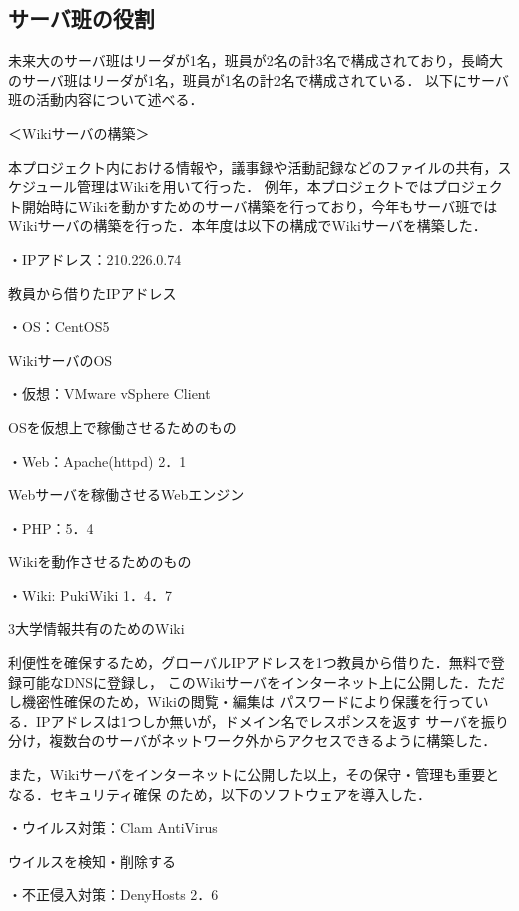 \subsection{サーバ班の役割}
\par 未来大のサーバ班はリーダが1名，班員が2名の計3名で構成されており，長崎大のサーバ班はリーダが1名，班員が1名の計2名で構成されている．
以下にサーバ班の活動内容について述べる．
\\
\par ＜Wikiサーバの構築＞
\par
本プロジェクト内における情報や，議事録や活動記録などのファイルの共有，スケジュール管理はWikiを用いて行った．
例年，本プロジェクトではプロジェクト開始時にWikiを動かすためのサーバ構築を行っており，今年もサーバ班では
Wikiサーバの構築を行った．本年度は以下の構成でWikiサーバを構築した．
\\
\par ・IPアドレス：210.226.0.74
\par 教員から借りたIPアドレス
\par ・OS：CentOS5
\par WikiサーバのOS
\par ・仮想：VMware vSphere Client
\par OSを仮想上で稼働させるためのもの
\par ・Web：Apache(httpd) 2．1
\par Webサーバを稼働させるWebエンジン
\par ・PHP：5．4
\par Wikiを動作させるためのもの
\par ・Wiki: PukiWiki 1．4．7
\par 3大学情報共有のためのWiki
\\
\par
利便性を確保するため，グローバルIPアドレスを1つ教員から借りた．無料で登録可能なDNSに登録し，
このWikiサーバをインターネット上に公開した．ただし機密性確保のため，Wikiの閲覧・編集は
パスワードにより保護を行っている．IPアドレスは1つしか無いが，ドメイン名でレスポンスを返す
サーバを振り分け，複数台のサーバがネットワーク外からアクセスできるように構築した．
\par
また，Wikiサーバをインターネットに公開した以上，その保守・管理も重要となる．セキュリティ確保
のため，以下のソフトウェアを導入した．
\\
\par ・ウイルス対策：Clam AntiVirus
\par ウイルスを検知・削除する
\par ・不正侵入対策：DenyHosts 2．6

